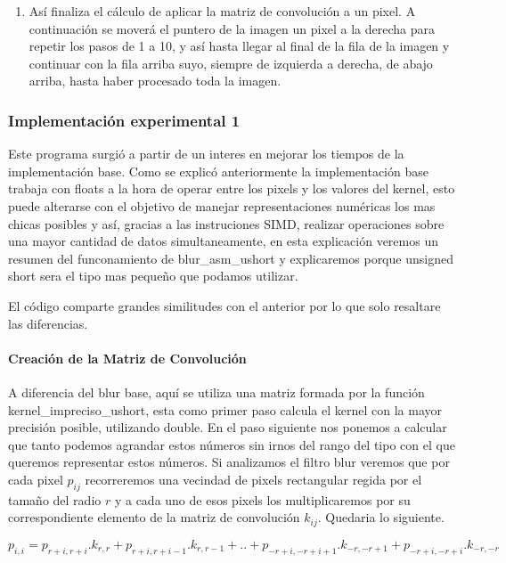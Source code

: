 \begin{enumerate}
	\item Así finaliza el cálculo de aplicar la matriz de convolución a un
		pixel. A continuación se moverá el puntero de la imagen un pixel a la
		derecha para repetir los pasos de 1 a 10, y así hasta llegar al final de
		la fila de la imagen y continuar con la fila arriba suyo, siempre de
		izquierda a derecha, de abajo arriba, hasta haber procesado toda la
		imagen.

\end{enumerate}




\subsubsection{Implementación experimental 1}
\label{sec:blur_imp_exp}

Este programa surgió a partir de un interes en mejorar los tiempos de la implementación base. Como se explicó anteriormente la implementación base trabaja con floats a la hora de operar entre los pixels y los valores del kernel, esto puede alterarse con el objetivo de manejar representaciones numéricas los mas chicas posibles y así, gracias a las instruciones SIMD, realizar operaciones sobre una mayor cantidad de datos simultaneamente, en esta explicación veremos un resumen del funconamiento de blur\_asm\_ushort y explicaremos porque unsigned short sera el tipo mas pequeño que podamos utilizar.

El código comparte grandes similitudes con el anterior por lo que solo resaltare las diferencias. 

\paragraph{Creación de la Matriz de Convolución}

A diferencia del blur base, aquí se utiliza una matriz formada por la función kernel\_impreciso\_ushort, esta como primer paso calcula el kernel con la mayor precisión posible, utilizando double. En el paso siguiente nos ponemos a calcular que tanto podemos agrandar estos números sin irnos del rango del tipo con el que queremos representar estos números. Si analizamos el filtro blur veremos que por cada pixel $p_{ij}$ recorreremos una vecindad de pixels rectangular regida por el tamaño del radio $r$ y a cada uno de esos pixels los multiplicaremos por su correspondiente elemento de la matriz de convolución $k_{ij}$. Quedaria lo siguiente.

$$ p_{i,i} = p_{r+i,r+i}.k_{r,r} + p_{r+i,r+i-1}.k_{r,r-1} + .. + p_{-r+i,-r+i+1}.k_{-r,-r+1} + p_{-r+i,-r+i}.k_{-r,-r} $$

